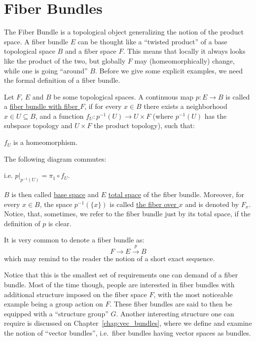 \chapter{Fiber Bundles}
The Fiber Bundle is a topological object generalizing the notion of the product space. A fiber bundle $E$ can be thought like a ``twisted product'' of a base topological space $B$ and a fiber space $F$. This means that locally it always looks like the product of the two, but globally $F$ may (homeomorphically) change, while one is going ``around'' $B$. Before we give some explicit examples, we need the formal definition of a fiber bundle.

\begin{definition} Let $F$, $E$ and $B$ be some topological spaces. A continuous map $p:E\to B$ is called a \ul{fiber bundle with fiber $F$}, if for every $x\in B$ there exists a neighborhood $x\in U\subseteq B$, and a function $f_U:p^{-1}(U)\to U\times F$ (where $p^{-1}(U)$ has the subspace topology and $U\times F$ the product topology), such that:
\begin{i_enum}
\item $f_U$ is a homeomorphism.
\item The following diagram commutes:
\begin{center}
\end{center}
i.e. $p|_{p^{-1}(U)}=\pi_1\circ f_U$.
\end{i_enum}
$B$ is then called \ul{base space} and $E$ \ul{total space} of the fiber bundle. Moreover, for every $x\in B$, the space $p^{-1}(\{x\})$ is called \ul{the fiber over $x$} and is denoted by $F_x$. Notice, that, sometimes, we refer to the fiber bundle just by its total space, if the definition of $p$ is clear.
\end{definition}

\begin{notation}
It is very common to denote a fiber bundle as:
\[F\to E\overset{p}{\to}B\]
which may remind to the reader the notion of a short exact sequence.
\end{notation}

Notice that this is the smallest set of requirements one can demand of a fiber bundle. Most of the time though, people are interested in fiber bundles with additional structure imposed on the fiber space $F$, with the most noticeable example being a group action on $F$. These fiber bundles are said to then be equipped with a ``structure group'' $G$. Another interesting structure one can require is discussed on Chapter~\ref{chap:vec_bundles}, where we define and examine the notion of ``vector bundles'', i.e.\ fiber bundles having vector spaces as bundles.

